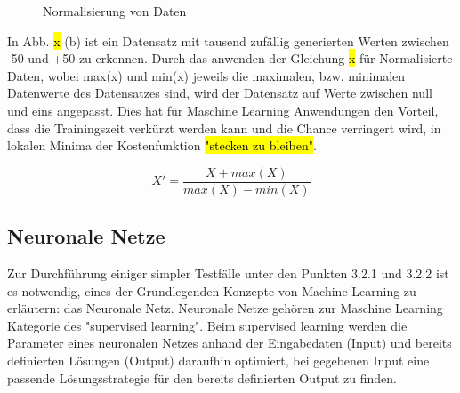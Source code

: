 \begin{figure}%
    \centering
    \qquad
    \caption{Normalisierung von Daten}%
    \label{Aktivierungsfunktionen}%
\end{figure}

In Abb. \hl{x} (b) ist ein Datensatz mit tausend zufällig generierten Werten zwischen -50 und +50 zu erkennen. Durch das anwenden der Gleichung \hl{x} für Normalisierte Daten, wobei max(x) und min(x) jeweils die maximalen, bzw. minimalen Datenwerte des Datensatzes sind, wird der Datensatz auf Werte zwischen null und eins angepasst. Dies hat für Maschine Learning Anwendungen den Vorteil, dass die Trainingszeit verkürzt werden kann und die Chance verringert wird, in lokalen Minima der Kostenfunktion \hl{"stecken zu bleiben"}. 

\begin{equation}
\label{Feature Scaling}
X' = \frac{X + max(X)}{max(X) - min(X)}
\end{equation}



\subsection{Neuronale Netze}

Zur Durchführung einiger simpler Testfälle unter den Punkten 3.2.1 und 3.2.2 ist es notwendig, eines der Grundlegenden Konzepte von Machine Learning zu erläutern: das Neuronale Netz.
Neuronale Netze gehören zur Maschine Learning Kategorie des "supervised learning". Beim supervised learning werden die Parameter eines neuronalen Netzes anhand der Eingabedaten (Input) und bereits definierten Lösungen (Output) daraufhin optimiert, bei gegebenen Input eine passende Lösungsstrategie für den bereits definierten Output zu finden. 


